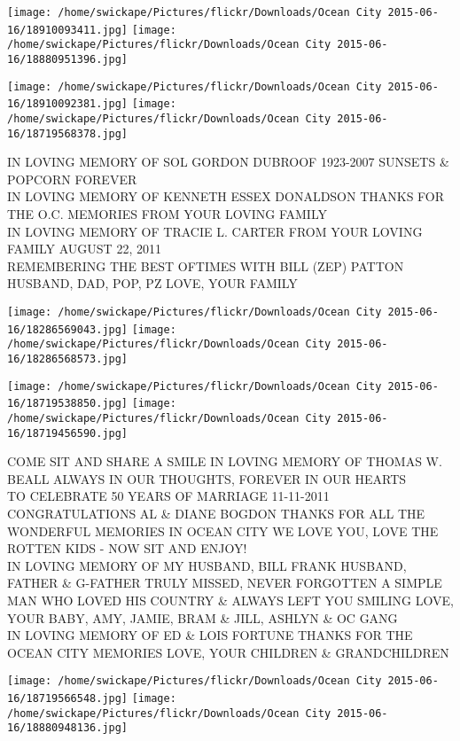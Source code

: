\documentclass[10pt,letterpaper]{article}
\begin{document}
\texttt{[image: /home/swickape/Pictures/flickr/Downloads/Ocean City 2015-06-16/18910093411.jpg]}
\texttt{[image: /home/swickape/Pictures/flickr/Downloads/Ocean City 2015-06-16/18880951396.jpg]}

\texttt{[image: /home/swickape/Pictures/flickr/Downloads/Ocean City 2015-06-16/18910092381.jpg]}
\texttt{[image: /home/swickape/Pictures/flickr/Downloads/Ocean City 2015-06-16/18719568378.jpg]}

IN LOVING MEMORY OF SOL GORDON DUBROOF 1923{-}2007 SUNSETS \& POPCORN FOREVER\\
IN LOVING MEMORY OF KENNETH ESSEX DONALDSON THANKS FOR THE O.C. MEMORIES FROM YOUR LOVING FAMILY\\
IN LOVING MEMORY OF TRACIE L. CARTER FROM YOUR LOVING FAMILY AUGUST 22, 2011\\
REMEMBERING THE BEST OFTIMES WITH BILL (ZEP) PATTON HUSBAND, DAD, POP, PZ LOVE, YOUR FAMILY
\pagebreak

\texttt{[image: /home/swickape/Pictures/flickr/Downloads/Ocean City 2015-06-16/18286569043.jpg]}
\texttt{[image: /home/swickape/Pictures/flickr/Downloads/Ocean City 2015-06-16/18286568573.jpg]}

\texttt{[image: /home/swickape/Pictures/flickr/Downloads/Ocean City 2015-06-16/18719538850.jpg]}
\texttt{[image: /home/swickape/Pictures/flickr/Downloads/Ocean City 2015-06-16/18719456590.jpg]}

COME SIT AND SHARE A SMILE IN LOVING MEMORY OF THOMAS W. BEALL ALWAYS IN OUR THOUGHTS, FOREVER IN OUR HEARTS\\
TO CELEBRATE 50 YEARS OF MARRIAGE 11{-}11{-}2011 CONGRATULATIONS AL \& DIANE BOGDON THANKS FOR ALL THE WONDERFUL MEMORIES IN OCEAN CITY WE LOVE YOU, LOVE THE ROTTEN KIDS {-} NOW SIT AND ENJOY!\\
IN LOVING MEMORY OF MY HUSBAND, BILL FRANK HUSBAND, FATHER \& G{-}FATHER TRULY MISSED, NEVER FORGOTTEN A SIMPLE MAN WHO LOVED HIS COUNTRY \& ALWAYS LEFT YOU SMILING LOVE, YOUR BABY, AMY, JAMIE, BRAM \& JILL, ASHLYN \& OC GANG\\
IN LOVING MEMORY OF ED \& LOIS FORTUNE THANKS FOR THE OCEAN CITY MEMORIES LOVE, YOUR CHILDREN \& GRANDCHILDREN
\pagebreak

\texttt{[image: /home/swickape/Pictures/flickr/Downloads/Ocean City 2015-06-16/18719566548.jpg]}
\texttt{[image: /home/swickape/Pictures/flickr/Downloads/Ocean City 2015-06-16/18880948136.jpg]}
\end{document}
